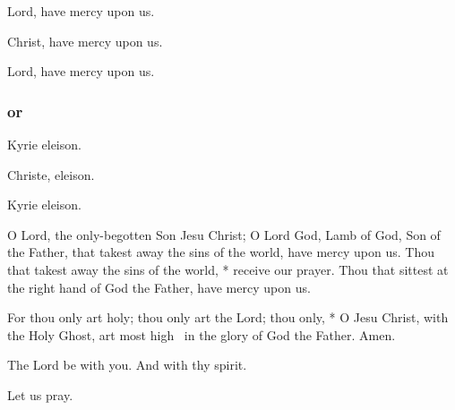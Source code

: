 \medskip


\smallskip

\centerline{Lord, have mercy upon us. }
\centerline{Christ, have mercy upon us. }
\centerline{Lord, have mercy upon us. }
\subsubsection{or}

\centerline{Kyrie eleison. }
\centerline{Christe, eleison. }
\centerline{Kyrie eleison. }

\bigskip



O Lord, the only-begotten Son Jesu Christ; O Lord God, Lamb of God, Son of the Father, that takest away the sins of the world, have mercy upon us. 
Thou that takest away the sins of the world, * receive our prayer. Thou that sittest at the right hand of God the Father, have mercy upon us.

For thou only art holy; thou only art the Lord; thou only, * O {Jesu} Christ, with the Holy Ghost, art most high \grecross\ in the glory of God the Father. Amen.

{\footnotesize{}\par}

\bigskip
\V The Lord be with you. \R And with thy spirit.

\centerline{Let us pray.}

